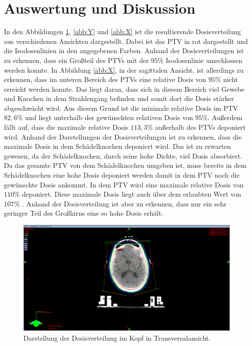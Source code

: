 \section{Auswertung und Diskussion}
\label{sec:Auswertung}

In den Abbildungen \ref{abb:Z}, \ref{abb:Y} und \ref{abb:X} ist die resultierende
Dosisverteilung aus verschiedenen Ansichten dargestellt.
Dabei ist das PTV in rot dargestellt und die Isodosenlinien in den angegebenen Farben.
Anhand der Dosisverteilungen ist zu erkennen, dass ein Großteil des PTVs mit der $95\%$ Isodosenlinie
umschlossen werden konnte. In Abbildung \ref{abb:X}, in der sagittalen Ansicht, ist allerdings
zu erkennen, dass im unteren Bereich des PTVs eine relative Dosis von $95\%$ nicht erreicht werden konnte.
Das liegt daran, dass sich in diesem Bereich viel Gewebe und Knochen in dem Strahlengang befinden und
somit dort die Dosis stärker abgeschwächt wird.
Aus diesem Grund ist die minimale relative Dosis im PTV $82,6\%$ und liegt unterhalb der gewünschten relativen Dosis von $95\%$.
Außerdem fällt auf, dass die maximale relative Dosis $113,3\%$ außerhalb des PTVs deponiert wird. Anhand der Darstellungen
der Dosisverteilungen ist zu erkennen, dass die maximale Dosis in dem Schädelknochen deponiert wird. Das ist zu erwarten gewesen, da
der Schädelknochen, durch seine hohe Dichte, viel Dosis absorbiert. Da das gesamte PTV von dem Schädelknochen umgeben ist, muss bereits
in dem Schädelknochen eine hohe Dosis deponiert werden damit in dem PTV noch die gewünschte Dosis ankommt.
In dem PTV wird eine maximale relative Dosis von $110\%$ deponiert. Diese maximale Dosis liegt auch über dem erlaubten Wert von $107\%$ \cite{ICRU}.
Anhand der Dosisverteilung ist aber zu erkennen, dass nur ein sehr geringer Teil des Großhirns eine so hohe Dosis erhält.

\begin{figure}[H]
  \centering
  \includegraphics[width=\textwidth]{Bilder/Hirn_z.png}
  \caption{Darstellung der Dosisverteilung im Kopf in Transversalansicht.}
  \label{abb:Z}
\end{figure}

